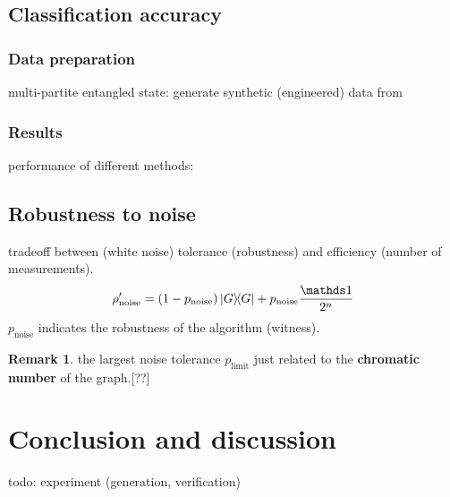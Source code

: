 \documentclass[
10pt,
aps,
pra,
linenumbers,
floatfix,
]{revtex4-2}
\theoremstyle{plain}
\theoremstyle{definition}
\newtheorem{remark}{Remark}
\newcommand{\noise}{\text{noise}}
\newcommand{\dm}{\rho}
\begin{document}
\subsection{Classification accuracy}
\subsubsection{Data preparation}
multi-partite entangled state: generate synthetic (engineered) data from

\subsubsection{Results}
performance of different methods: 

\subsection{Robustness to noise}
tradeoff between (white noise) tolerance (robustness) and efficiency (number of measurements).
\begin{equation}
	\dm_{\noise}' = (1-p_{\noise}) \op{G} + p_{\noise} \frac{\identity}{2^n}
\end{equation}
$p_{\noise}$ indicates the robustness of the algorithm (witness).
\begin{remark}
	the largest noise tolerance $p_{\text{limit}}$ just related to the \textbf{chromatic number} of the graph.[??]
\end{remark}
% 
% 

\section{Conclusion and discussion}
todo: experiment (generation, verification) \cite{luEntanglementStructureEntanglement2018}
\end{document}
